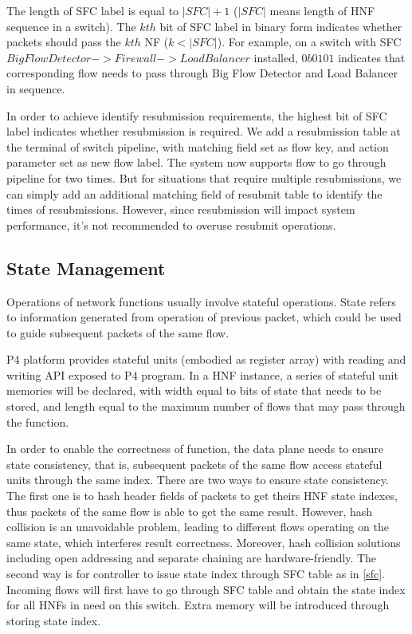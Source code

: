 \documentclass[10pt, conference, letterpaper]{IEEEtran}
\begin{document}
The length of SFC label is equal to $|SFC|+1$ ($|SFC|$ means length of HNF sequence in a switch). The $kth$ bit of SFC label in binary form indicates whether packets should pass the $kth$ NF ($k <|SFC|$). For example, on a switch with SFC $Big Flow Detector->Firewall->Load Balancer$ installed, $0b0101$ indicates that corresponding flow needs to pass through Big Flow Detector and Load Balancer in sequence. 

In order to achieve identify resubmission requirements, the highest bit of SFC label indicates whether resubmission is required. We add a resubmission table at the terminal of switch pipeline, with matching field set as flow key, and action parameter set as new flow label. 
The system now supports flow to go through pipeline for two times. But for situations that require multiple resubmissions, we can simply add an additional matching field of resubmit table to identify the times of resubmissions. However, since resubmission will impact system performance, it's not recommended to overuse resubmit operations. 


\subsection{State Management}
Operations of network functions usually involve stateful operations. State refers to information generated from operation of previous packet, which could be used to guide subsequent packets of the same flow. 

P4 platform provides stateful units (embodied as register array) with reading and writing API exposed to P4 program.
In a HNF instance, a series of stateful unit memories will be declared, with width equal to bits of state that needs to be stored, and length equal to the maximum number of flows that may pass through the function.

In order to enable the correctness of function, the data plane needs to ensure state consistency, that is, subsequent packets of the same flow access stateful units through the same index. There are two ways to ensure state consistency. 
The first one is to hash header fields of packets to get theirs HNF state indexes, thus packets of the same flow is able to get the same result.
However, hash collision is an unavoidable problem, leading to different flows operating on the same state, which interferes result correctness. Moreover, hash collision solutions including open addressing and separate chaining are hardware-friendly. 
The second way is for controller to issue state index through SFC table as in \ref{sfc}. Incoming flows will first have to go through SFC table and obtain the state index for all HNFs in need on this switch. Extra memory will be introduced through storing state index.
\end{document}
